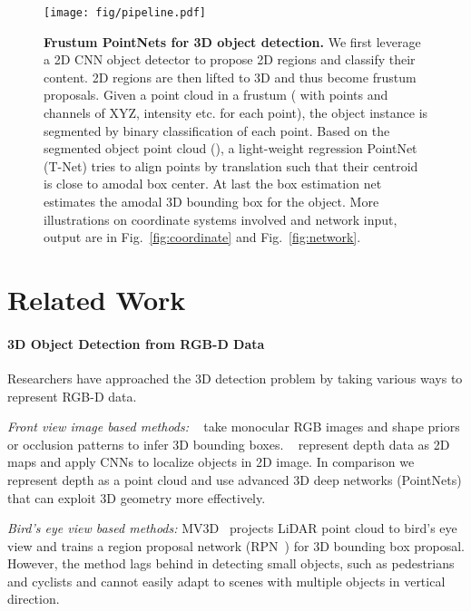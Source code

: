 \documentclass[10pt,twocolumn,letterpaper]{article}
\begin{document}
\begin{figure*}[t!]
    \centering
    \texttt{[image: fig/pipeline.pdf]}
    \caption{\textbf{Frustum PointNets for 3D object detection.} We first leverage a 2D CNN object detector to propose 2D regions and classify their content. 2D regions are then lifted to 3D and thus become frustum proposals. Given a point cloud in a frustum ( with  points and  channels of XYZ, intensity etc. for each point), the object instance is segmented by binary classification of each point. Based on the segmented object point cloud (), a light-weight regression PointNet (T-Net) tries to align points by translation such that their centroid is close to amodal box center. At last the box estimation net estimates the amodal 3D bounding box for the object. More illustrations on coordinate systems involved and network input, output are in Fig.~\ref{fig:coordinate} and Fig.~\ref{fig:network}.}
    \label{fig:pipeline}
\end{figure*} 
\section{Related Work}
\paragraph{3D Object Detection from RGB-D Data} Researchers have approached the 3D detection problem by taking various ways to represent RGB-D data.

\emph{Front view image based methods:} ~\cite{chen2016monocular, mousavian20163d, xiang2015data} take monocular RGB images and shape priors or occlusion patterns to infer 3D bounding boxes. ~\cite{li2016vehicle, deng2017amodal} represent depth data as 2D maps and apply CNNs to localize objects in 2D image. In comparison we represent depth as a point cloud and use advanced 3D deep networks (PointNets) that can exploit 3D geometry more effectively.

\emph{Bird's eye view based methods:} MV3D~\cite{cvpr17chen} projects LiDAR point cloud to bird's eye view and trains a region proposal network (RPN~\cite{ren2015faster}) for 3D bounding box proposal. However, the method lags behind in detecting small objects, such as pedestrians and cyclists and cannot easily adapt to scenes with multiple objects in vertical direction.
\end{document}
